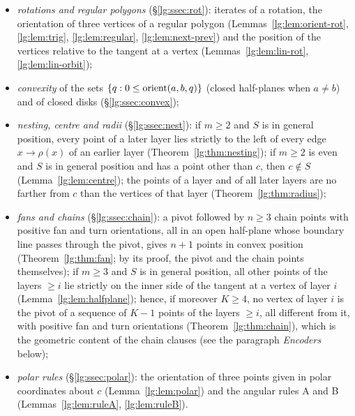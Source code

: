 \begin{itemize}
\item \emph{rotations and regular polygons} (\S\ref{lg:ssec:rot}): iterates of a rotation, the orientation of three
  vertices of a regular polygon (Lemmas~\ref{lg:lem:orient-rot}, \ref{lg:lem:trig}, \ref{lg:lem:regular},
  \ref{lg:lem:next-prev}) and the position of the vertices relative to the tangent at a vertex
  (Lemmas~\ref{lg:lem:lin-rot}, \ref{lg:lem:lin-orbit});
\item \emph{convexity} of the sets $\{q:0\le\operatorname{orient}(a,b,q)\}$ (closed half-planes when $a\ne b$) and of closed disks
  (\S\ref{lg:ssec:convex});
\item \emph{nesting, centre and radii} (\S\ref{lg:ssec:nest}): if $m\ge2$ and $S$ is in general position, every point
  of a later layer lies strictly to the left of every edge $x\to\rho(x)$ of an earlier layer
  (Theorem~\ref{lg:thm:nesting}); if $m\ge2$ is even and $S$ is in general position and has a point other than $c$,
  then $c\notin S$ (Lemma~\ref{lg:lem:centre}); the points of a layer and of all later layers are no farther from $c$
  than the vertices of that layer (Theorem~\ref{lg:thm:radius});
\item \emph{fans and chains} (\S\ref{lg:ssec:chain}): a pivot followed by $n\ge3$ chain points with positive fan and
  turn orientations, all in an open half-plane whose boundary line passes through the pivot, gives $n+1$ points in
  convex position (Theorem~\ref{lg:thm:fan}; by its proof, the pivot and the chain points themselves); if $m\ge3$ and
  $S$ is in general position, all other points of the layers $\ge i$ lie strictly on the inner side of the tangent at
  a vertex of layer $i$ (Lemma~\ref{lg:lem:halfplane}); hence, if moreover $K\ge4$, no vertex of layer $i$ is the pivot
  of a sequence of $K-1$ points of the layers $\ge i$, all different from it, with positive fan and turn orientations
  (Theorem~\ref{lg:thm:chain}), which is the geometric content of the chain clauses (see the paragraph
  \emph{Encoders} below);
\item \emph{polar rules} (\S\ref{lg:ssec:polar}): the orientation of three points given in polar coordinates about $c$
  (Lemma~\ref{lg:lem:polar}) and the angular rules A and B (Lemmas~\ref{lg:lem:ruleA}, \ref{lg:lem:ruleB}).
\end{itemize}

